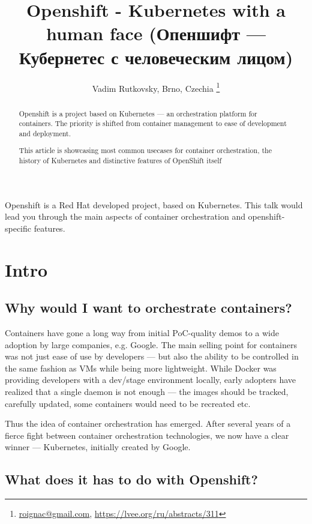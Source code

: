 \documentclass[10pt, a5paper]{article}
\begin{document}
\title{Openshift - Kubernetes with a human face (Опеншифт --- Кубернетес с человеческим лицом)}
\author{Vadim Rutkovsky, Brno, Czechia \footnote{\url{roignac@gmail.com}, \url {https://lvee.org/ru/abstracts/311}}}
\maketitle
\begin{abstract}
Openshift is a project based on Kubernetes --- an orchestration platform for containers. The priority is shifted from container management to ease of  development and deployment.

This article is showcasing most common usecases for container orchestration, the history of Kubernetes and distinctive features of OpenShift itself
\end{abstract}
Openshift is a Red Hat developed project, based on Kubernetes. This talk would lead you through the main aspects of container orchestration and openshift-specific features.

\section*{Intro}

\subsection*{Why would I want to orchestrate containers?}

Containers have gone a long way from initial PoC-quality demos to a wide adoption
by large companies, e.g. Google. The main selling point for containers was not just
ease of use by developers --- but also the ability to be controlled in the same fashion as VMs
while being more lightweight. While Docker was providing developers with a dev/stage environment
locally, early adopters have realized that a single daemon is not enough --- the images should be
tracked, carefully updated, some containers would need to be recreated etc.

Thus the idea of container orchestration has emerged.
After several years of a fierce fight between container orchestration technologies,
we now have a clear winner --- Kubernetes, initially created by Google.

\subsection*{What does it has to do with Openshift?}
\end{document}
